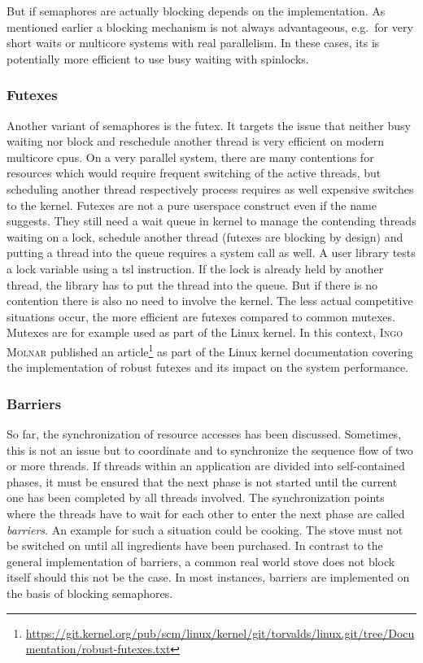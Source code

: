 But if semaphores are actually blocking depends on the implementation.
As mentioned earlier a blocking mechanism is not always advantageous, e.g.\ for very short waits or multicore systems with real parallelism.
In these cases, its is potentially more efficient to use busy waiting with spinlocks\cite{glatz2015betriebssysteme}.

\subsubsection*{Futexes}
Another variant of semaphores is the \ac{futex}. 
It targets the issue that neither busy waiting nor block and reschedule another thread is very efficient on modern multicore \acp{cpu}.
On a very parallel system, there are many contentions for resources which would require frequent switching of the active threads, but scheduling another thread respectively process requires as well expensive switches to the kernel\cite{tanenbaum-modern-operating-systems}.
Futexes are not a pure userspace construct even if the name suggests. 
They still need a wait queue in kernel to manage the contending threads waiting on a lock, schedule another thread (futexes are blocking by design) and putting a thread into the queue requires a system call as well.
A user library tests a lock variable using a \ac{tsl} instruction.
If the lock is already held by another thread, the library has to put the thread into the queue.
But if there is no contention there is also no need to involve the kernel\cite{tanenbaum-modern-operating-systems}.
The less actual competitive situations occur, the more efficient are futexes compared to common mutexes.
Mutexes are for example used as part of the Linux kernel. 
In this context, \textsc{Ingo Molnar} published an article\footnote{\url{https://git.kernel.org/pub/scm/linux/kernel/git/torvalds/linux.git/tree/Documentation/robust-futexes.txt}} as part of the Linux kernel documentation covering the implementation of robust futexes and its impact on the system performance.

\subsubsection*{Barriers}
So far, the synchronization of resource accesses has been discussed.
Sometimes, this is not an issue but to coordinate and to synchronize the sequence flow of two or more threads.
If threads within an application are divided into self-contained phases, it must be ensured that the next phase is not started until the current one has been completed by all threads involved\cite{tanenbaum-modern-operating-systems}.
The synchronization points where the threads have to wait for each other to enter the next phase are called \textit{barriers}.
An example for such a situation could be cooking.
The stove must not be switched on until all ingredients have been purchased.
In contrast to the general implementation of barriers, a common real world stove does not block itself should this not be the case.
In most instances, barriers are implemented on the basis of blocking semaphores\cite{glatz2015betriebssysteme}.



